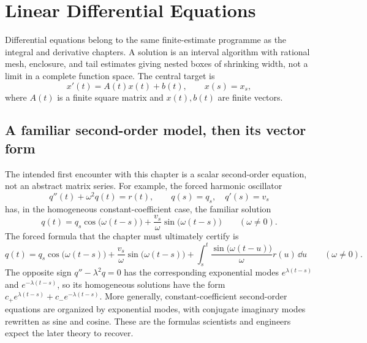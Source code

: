 \chapter{Linear Differential Equations}
\label{ch:differential-equations}

Differential equations belong to the same finite-estimate programme as the
integral and derivative chapters. A solution is an interval algorithm with
rational mesh, enclosure, and tail estimates giving nested boxes of shrinking
width, not a limit in a complete function space. The central target is
\begin{equation}\label{eq:linear-ode}
  x'(t)=A(t)x(t)+b(t),\qquad x(s)=x_s,
\end{equation}
where \(A(t)\) is a finite square matrix and \(x(t),b(t)\) are finite vectors.

\section{A familiar second-order model, then its vector form}

The intended first encounter with this chapter is a scalar second-order
equation, not an abstract matrix series.  For example, the forced harmonic
oscillator
\begin{equation}\label{eq:forced-oscillator}
 q''(t)+\omega^2q(t)=r(t),\qquad
 q(s)=q_s,\quad q'(s)=v_s
\end{equation}
has, in the homogeneous constant-coefficient case, the familiar solution
\[
 q(t)=q_s\cos\bigl(\omega(t-s)\bigr)
      +\frac{v_s}{\omega}\sin\bigl(\omega(t-s)\bigr)
 \qquad(\omega\ne0).
\]
The forced formula that the chapter must ultimately certify is
\begin{equation}\label{eq:forced-oscillator-duhamel}
 q(t)=q_s\cos\bigl(\omega(t-s)\bigr)
      +\frac{v_s}{\omega}\sin\bigl(\omega(t-s)\bigr)
      +\int_s^t\frac{\sin\bigl(\omega(t-u)\bigr)}{\omega}r(u)\,\dd u
 \qquad(\omega\ne0).
\end{equation}
The opposite sign \(q''-\lambda^2q=0\) has the corresponding exponential
modes \(e^{\lambda(t-s)}\) and \(e^{-\lambda(t-s)}\), so its homogeneous
solutions have the form \(c_+e^{\lambda(t-s)}+c_-e^{-\lambda(t-s)}\).
More generally,
constant-coefficient second-order equations are organized by exponential
modes, with conjugate imaginary modes rewritten as sine and cosine.  These
are the formulas scientists and engineers expect the later theory to recover.


